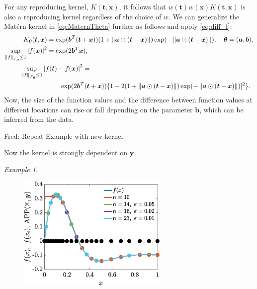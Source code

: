\documentclass[]{mcom-l}
\theoremstyle{theorem}
\theoremstyle{remark}
\newtheorem{example}{Example}
\newcommand{\ba}{{\boldsymbol{a}}}
\newcommand{\bb}{{\boldsymbol{b}}}
\newcommand{\bx}{{\boldsymbol{x}}}
\newcommand{\by}{{\boldsymbol{y}}}
\newcommand{\bt}{{\boldsymbol{t}}}
\newcommand{\btheta}{{\boldsymbol{\theta}}}
\newcommand{\calf}{{\mathcal{F}}}
\def\abs#1{\ensuremath{\left \lvert #1 \right \rvert}}
\newcommand{\norm}[2][{}]{\ensuremath{\left \lVert #2 \right \rVert}_{#1}}
\newcommand{\FredNote}[1]{{\color{blue}Fred: #1}}
\begin{document}
For any reproducing kernel, $K(\bt ,\bx)$, it follows that $w(\bt)w(\bx)K(\bt ,\bx)$ is also a reproducing kernel regardless of the choice of $w$.  We can generalize the Mat\'ern kernel in \eqref{eq:MaternTheta} further as follows and apply \eqref{eq:diff_f}:
\begin{align} \label{eq:MaternAB}
K_\btheta(\bt,\bx) &= \exp(\bb^T(\bt + \bx))(1 +  \norm{\ba \odot (\bt-\bx)}) \exp(-\norm{\ba \odot (\bt-\bx)}),  \quad \btheta=(\ba, \bb), \\
\nonumber
\sup_{\norm[\calf_{\btheta}]{f} \le 1} \abs{f(\bx)}^2 &= \exp(2\bb^T\bx), \\
\nonumber
\MoveEqLeft[4]{\sup_{\norm[\calf_{\btheta}]{f} \le 1} \abs{f(\bt) - f(\bx)}^2} = \\
\nonumber 
& \qquad \exp(2\bb^T(\bt + \bx))\{ 1 - 2 (1 +  \norm{\ba \odot (\bt-\bx)}) \exp(-\norm{\ba \odot (\bt-\bx)})]^2\}.
\end{align}
Now, the size of the function values and the difference between function values at different locations can rise or fall depending on the parameter $\bb$, which can be inferred from the data.


\FredNote{Repeat Example with new kernel}

Now the kernel is strongly dependent on $\by$

\begin{example}
\label{ex:compfun2}
	\begin{figure}[H]
		\centering
		\includegraphics[height = 5.5cm]{ProgramsImages/Alg3_LeftPeakFun_SpatialMatern_adapt_th.eps} 
		\caption{ \label{fig:ex5}}
	\end{figure}

		
	


\end{example}

\end{document}
